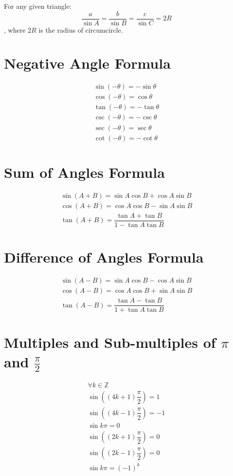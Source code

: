 \documentclass[openany, oneside]{book}
\begin{document}
For any given triangle:
\begin{equation}
\dfrac{a}{\sin A}=\dfrac{b}{\sin B}=\dfrac{c}{\sin C}=2R
\end{equation}, where $2R$ is the radius of circumcircle.

\section{Negative Angle Formula}
\begin{align}
\sin (-\theta)=-\sin \theta\\
\cos (-\theta)=\cos \theta\\
\tan (-\theta)=-\tan \theta\\
\csc (-\theta)=-\csc \theta\\
\sec (-\theta)=\sec \theta\\
\cot (-\theta)=-\cot \theta
\end{align}

\section{Sum of Angles Formula}
\begin{align}
\sin (A+B)=\sin A\cos B+\cos A\sin B\\
\cos (A+B)=\cos A\cos B-\sin A\sin B\\
\tan (A+B)=\dfrac{\tan A+\tan B}{1-\tan A\tan B}
\end{align}

\section{Difference of Angles Formula}
\begin{align}
\sin (A-B)=\sin A\cos B-\cos A\sin B\\
\cos (A-B)=\cos A\cos B+\sin A\sin B\\
\tan (A-B)=\dfrac{\tan A-\tan B}{1+\tan A\tan B}
\end{align}

\section{Multiples and Sub-multiples of $\pi$ and $\frac{\pi}{2}$}
\begin{align}
\forall k \in \mathbb{Z}\nonumber\\
\sin \left((4k+1)\dfrac{\pi}{2}\right)=1\\
\sin \left((4k-1)\dfrac{\pi}{2}\right)=-1\\
\sin k\pi=0\\
\sin \left((2k+1)\dfrac{\pi}{2}\right)=0\\
\sin \left((2k-1)\dfrac{\pi}{2}\right)=0\\
\sin k\pi=(-1)^k
\end{align}
\end{document}
